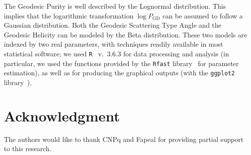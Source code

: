 \documentclass[journal]{IEEEtran}
\begin{document}
The Geodesic Purity is well described by the Lognormal distribution.
This implies that the logarithmic transformation $\log P_{\text{GD}}$ can be assumed to follow a Gaussian distribution.
Both the Geodesic Scattering Type Angle and the Geodesic Helicity can be modeled by the Beta distribution.
These two models are indexed by two real parameters, with techniques readily available in most statistical software; we used \texttt{R}~\cite{RManual} v.~3.6.3 for data processing and analysis (in particular, we used the functions provided by the \texttt{Rfast} library~\cite{Rfast} for parameter estimation), as well as for producing the graphical outputs (with the \texttt{ggplot2} library~\cite{ggplot2}).

\section*{Acknowledgment}

The authors would like to thank CNPq and Fapeal for providing partial support to this research.



\end{document}
